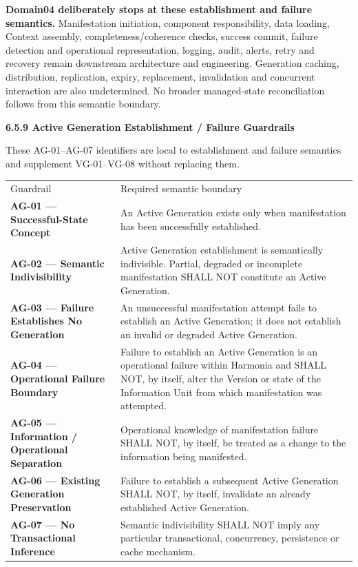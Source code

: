 \textbf{Domain04 deliberately stops at these establishment and failure semantics.}
Manifestation initiation, component responsibility, data loading, Context
assembly, completeness/coherence checks, success commit, failure detection and
operational representation, logging, audit, alerts, retry and recovery remain
downstream architecture and engineering. Generation caching, distribution,
replication, expiry, replacement, invalidation and concurrent interaction are
also undetermined. No broader managed-state reconciliation follows from this
semantic boundary.



\par\medskip\textbf{6.5.9 Active Generation Establishment / Failure Guardrails}\par


These AG-01–AG-07 identifiers are local to establishment and failure semantics
and supplement VG-01–VG-08 without replacing them.



\begin{longtable}{>{\raggedright\arraybackslash}p{}>{\raggedright\arraybackslash}p{}}
Guardrail & Required semantic boundary \\
\textbf{AG-01 — Successful-State Concept} & An Active Generation exists only when manifestation has been successfully established. \\
\textbf{AG-02 — Semantic Indivisibility} & Active Generation establishment is semantically indivisible. Partial, degraded or incomplete manifestation SHALL NOT constitute an Active Generation. \\
\textbf{AG-03 — Failure Establishes No Generation} & An unsuccessful manifestation attempt fails to establish an Active Generation; it does not establish an invalid or degraded Active Generation. \\
\textbf{AG-04 — Operational Failure Boundary} & Failure to establish an Active Generation is an operational failure within Harmonia and SHALL NOT, by itself, alter the Version or state of the Information Unit from which manifestation was attempted. \\
\textbf{AG-05 — Information / Operational Separation} & Operational knowledge of manifestation failure SHALL NOT, by itself, be treated as a change to the information being manifested. \\
\textbf{AG-06 — Existing Generation Preservation} & Failure to establish a subsequent Active Generation SHALL NOT, by itself, invalidate an already established Active Generation. \\
\textbf{AG-07 — No Transactional Inference} & Semantic indivisibility SHALL NOT imply any particular transactional, concurrency, persistence or cache mechanism. \\
\end{longtable}


